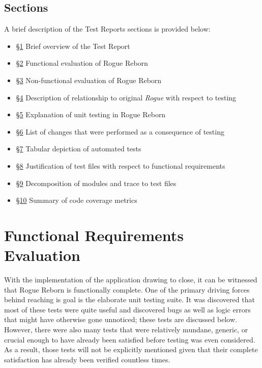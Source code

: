 \documentclass[12pt, titlepage]{article}
\newcommand{\newsection}[1]{\newpage\section{#1}}
\begin{document}
	\subsection{Sections}
	A brief description of the Test Reports sections is provided below:

	\begin{itemize}
		\item [] \hyperref[Section_Intro]{\S 1} Brief overview of the Test Report
		\item [] \hyperref[Section_FR_Evaluation]{\S 2} Functional evaluation of Rogue Reborn
		\item [] \hyperref[Section_NFR_Evaluation]{\S 3} Non-functional evaluation of Rogue Reborn
		\item [] \hyperref[Section_Comparison]{\S 4} Description of relationship to original \textit{Rogue} with respect to testing 
		\item [] \hyperref[Section_UT]{\S 5} Explanation of unit testing in Rogue Reborn
		\item [] \hyperref[Section_Changes]{\S 6} List of changes that were performed as a consequence of testing
		\item [] \hyperref[Section_Automated]{\S 7} Tabular depiction of automated tests
		\item [] \hyperref[Section_R_Trace]{\S 8} Justification of test files with respect to functional requirements
		\item [] \hyperref[Section_M_Trace]{\S 9} Decomposition of modules and trace to test files
		\item [] \hyperref[Section_Metrics]{\S 10} Summary of code coverage metrics

	\end{itemize}

\newsection{Functional Requirements Evaluation} \label{Section_FR_Evaluation}
	With the implementation of the application drawing to close, it can be witnessed that Rogue Reborn is functionally complete.  One of the primary driving forces behind reaching is goal is the elaborate unit testing suite.  It was discovered that most of these tests were quite useful and discovered bugs as well as logic errors that might have otherwise gone unnoticed; these tests are discussed below.  However, there were also many tests that were relatively mundane, generic, or crucial enough to have already been satisfied before testing was even considered.  As a result, those tests will not be explicitly mentioned given that their complete satisfaction has already been verified countless times.\\
\end{document}

